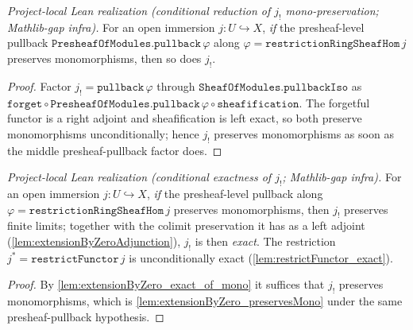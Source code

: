 \begin{lemma}

  \label{lem:extensionByZero_preservesMono}
  \textit{Project-local Lean realization (conditional reduction of $j_!$
  mono-preservation; Mathlib-gap infra).}
  For an open immersion $j : U \hookrightarrow X$, \emph{if} the presheaf-level
  pullback $\mathtt{PresheafOfModules.pullback}\,\varphi$ along
  $\varphi = \mathtt{restrictionRingSheafHom}\,j$ preserves monomorphisms, then so
  does $j_!$.
  \begin{proof}
    Factor $j_! = \mathtt{pullback}\,\varphi$ through
    $\mathtt{SheafOfModules.pullbackIso}$ as
    $\mathtt{forget} \circ \mathtt{PresheafOfModules.pullback}\,\varphi \circ
    \mathtt{sheafification}$. The forgetful functor is a right adjoint and
    sheafification is left exact, so both preserve monomorphisms unconditionally;
    hence $j_!$ preserves monomorphisms as soon as the middle presheaf-pullback
    factor does.
  \end{proof}
\end{lemma}

\begin{lemma}

  \label{lem:extensionByZero_exact}
  \textit{Project-local Lean realization (conditional exactness of $j_!$;
  Mathlib-gap infra).}
  For an open immersion $j : U \hookrightarrow X$, \emph{if} the presheaf-level
  pullback along $\varphi = \mathtt{restrictionRingSheafHom}\,j$ preserves
  monomorphisms, then $j_!$ preserves finite limits; together with the colimit
  preservation it has as a left adjoint (\cref{lem:extensionByZeroAdjunction}),
  $j_!$ is then \emph{exact}. The restriction $j^{*} = \mathtt{restrictFunctor}\,j$
  is unconditionally exact (\cref{lem:restrictFunctor_exact}).
  \begin{proof}
    By \cref{lem:extensionByZero_exact_of_mono} it suffices that $j_!$ preserves
    monomorphisms, which is \cref{lem:extensionByZero_preservesMono} under the
    same presheaf-pullback hypothesis.
  \end{proof}
\end{lemma}

